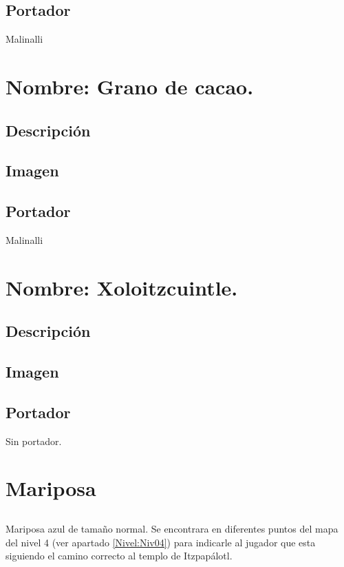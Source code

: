 	\subsection{Portador}
	Malinalli 
	
	\section{Nombre: Grano de cacao.}\label{item:cacao}
	\subsection{Descripción}
	
	\subsection{Imagen}
	\subsection{Portador}
	Malinalli 
	
	\section{Nombre: Xoloitzcuintle.}\label{item:Xolo}
	\subsection{Descripción}
	
	\subsection{Imagen}
	\subsection{Portador}
	Sin portador. 
	
	\section{Mariposa} \label{item:Mariposa}
		\subsection{}
		Mariposa azul de tamaño normal. Se encontrara en diferentes puntos del mapa del nivel 4 (ver apartado \ref{Nivel:Niv04})  para indicarle al jugador que esta siguiendo el camino correcto al templo de Itzpapálotl.